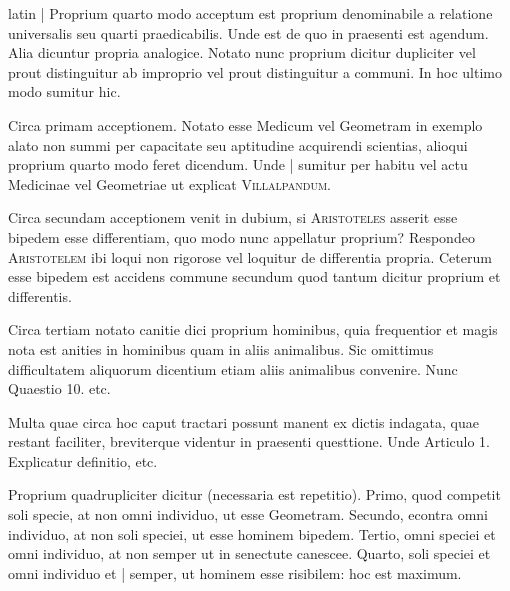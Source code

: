 \begin{otherlanguage*}{latin}
\pstart
 \textnormal{|}  Proprium quarto modo acceptum est proprium denominabile a relatione universalis seu quarti praedicabilis. Unde est de quo in praesenti est agendum. Alia dicuntur propria analogice. Notato nunc proprium dicitur dupliciter vel prout distinguitur ab improprio vel prout distinguitur a communi. In hoc ultimo modo sumitur hic. 
\pend

\pstart
 Circa primam acceptionem. Notato esse Medicum vel Geometram in exemplo alato non summi per capacitate seu aptitudine acquirendi scientias, alioqui proprium quarto modo feret dicendum. Unde \textnormal{|}    sumitur per habitu vel actu Medicinae vel Geometriae ut explicat \textsc{Villalpandum}. 
\pend

\pstart
  Circa secundam acceptionem venit in dubium, si \textsc{Aristoteles} asserit esse bipedem esse differentiam, quo modo nunc appellatur proprium? Respondeo \textsc{Aristotelem} ibi loqui non rigorose vel loquitur de differentia propria. Ceterum esse bipedem est accidens commune secundum quod tantum dicitur proprium et differentis. 
\pend

\pstart
  Circa tertiam notato canitie dici proprium hominibus, quia frequentior et magis nota est anities in hominibus quam in aliis animalibus. Sic omittimus difficultatem aliquorum dicentium etiam aliis animalibus convenire. Nunc Quaestio 10. etc. 
\pend

        \pstart
        \pend
      
\pstart
 Multa quae circa hoc caput tractari possunt manent ex dictis indagata, quae restant faciliter, breviterque videntur in praesenti questtione. Unde Articulo 1. Explicatur definitio, etc. 
\pend

        \pstart
        \pend
      
\pstart
  Proprium quadrupliciter dicitur (necessaria est repetitio). Primo, quod competit soli specie, at non omni individuo, ut esse Geometram. Secundo, econtra omni individuo, at non soli speciei, ut esse hominem bipedem. Tertio, omni speciei et omni individuo, at non semper ut in senectute canescee. Quarto, soli speciei et omni individuo et \textnormal{|} semper, ut hominem esse risibilem: hoc est maximum. 
\pend


\end{otherlanguage*}

